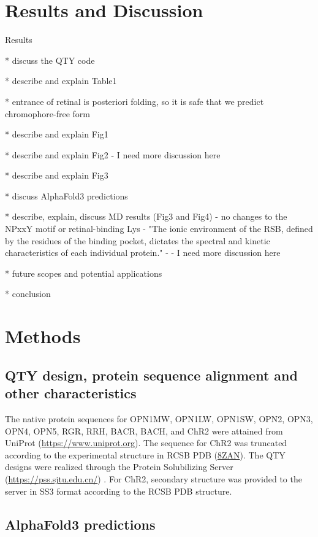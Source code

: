 \documentclass[fleqn,10pt,lineno]{manuscript}
\begin{document}
\section*{Results and Discussion}

Results

* discuss the QTY code

* describe and explain Table1

* entrance of retinal is posteriori folding, so it is safe that we predict chromophore-free form

* describe and explain Fig1

* describe and explain Fig2
	- I need more discussion here

* describe and explain Fig3

* discuss AlphaFold3 predictions

* describe, explain, discuss MD results (Fig3 and Fig4)
        - no changes to the NPxxY motif or retinal-binding Lys
        - "The ionic environment of the RSB, defined by the residues of the binding pocket, dictates the spectral and kinetic characteristics of each individual protein." - \citep{Fenno_2011}
	- I need more discussion here

* future scopes and potential applications

* conclusion

\section*{Methods}

\subsection*{QTY design, protein sequence alignment and other characteristics}

The native protein sequences for OPN1MW, OPN1LW, OPN1SW, OPN2, OPN3, OPN4, OPN5, RGR, RRH, BACR, BACH, and ChR2 were attained from UniProt (\url{https://www.uniprot.org}). The sequence for ChR2 was truncated according to the experimental structure in RCSB PDB (\href{https://www.rcsb.org/structure/8ZAN}{8ZAN}). The QTY designs were realized through the Protein Solubilizing Server (\url{https://pss.sjtu.edu.cn/}) \citep{Tao_2022}. For ChR2, secondary structure was provided to the server in SS3 format according to the RCSB PDB structure. 

\subsection*{AlphaFold3 predictions}
\end{document}
